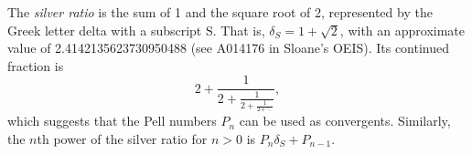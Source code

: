 \documentclass[12pt]{article}
\begin{document}
The {\em silver ratio} is the sum of 1 and the square root of 2, represented by the Greek letter delta with a subscript S. That is, $\delta_S = 1 + \sqrt{2}$, with an approximate value of 2.4142135623730950488 (see A014176 in Sloane's OEIS). Its continued fraction is $$2 + \frac{1}{2 + \frac{1}{2 + \frac{1}{2 + \ddots}}},$$ which suggests that the Pell numbers $P_n$ can be used as convergents. Similarly, the $n$th power of the silver ratio for $n > 0$ is $P_n\delta_S + P_{n - 1}$.
\end{document}
